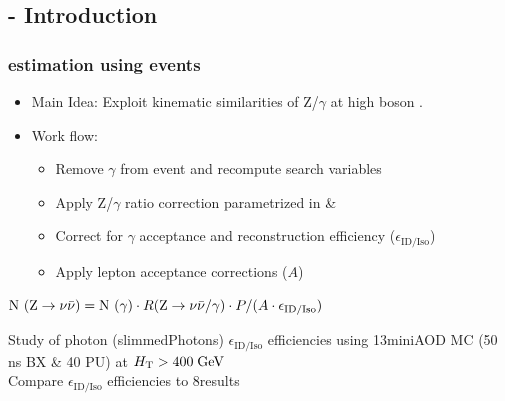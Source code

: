 \documentclass{beamer}
\begin{document}
\subsection{\photonJets - Introduction}
\begin{frame}
\frametitle{\ZInv estimation using \photonJets events}
\begin{itemize}
 \item Main Idea: Exploit kinematic similarities of Z/$\gamma$ at high boson \pt.
 \item Work flow:
 \begin{itemize}
  \item Remove $\gamma$ from event and recompute search variables
  \item Apply Z/$\gamma$ ratio correction parametrized in \MHT \& \NJets
  \item Correct for $\gamma$ acceptance and reconstruction efficiency ($\epsilon_{\text{ID/Iso}}$)
  \item Apply lepton acceptance corrections ($A$)
 \end{itemize}
\end{itemize}
  \begin{centering}
  $\text{N }(\text{Z}\rightarrow\nu\bar{\nu}) = \text{N }(\gamma)\cdot R(\text{Z}\rightarrow\nu\bar{\nu}/\gamma)\cdot P/ (A\cdot \epsilon_{\text{ID/Iso}})$
  \end{centering}
\begin{block}{}
\centering
Study of photon (slimmedPhotons) $\epsilon_{\text{ID/Iso}}$ efficiencies using 13\tev miniAOD MC (50 ns BX \& 40 PU) at $H_{\text{T}}>400\;\text{Ge}\kern-0.06667em\text{V}$\\
Compare $\epsilon_{\text{ID/Iso}}$ efficiencies to 8\tev results
\end{block}

\end{frame}
\end{document}

